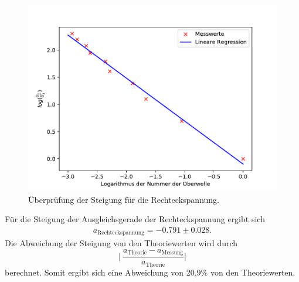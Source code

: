 \begin{figure}[H]
  \centering
  \includegraphics{plot1.pdf}
  \caption{Überprüfung der Steigung für die Rechteckspannung.}
  \label{fig:plot1}
\end{figure}
Für die Steigung der Ausgleichsgerade der Rechteckspannung ergibt sich
\begin{align*}
 a_{\text{Rechteckspannung}}= -0.791 \pm 0.028.
\end{align*}
Die Abweichung der Steigung von den Theoriewerten wird durch
\begin{equation}
  \Biggl\lvert \: \frac{a_{\text{Theorie}}-a_{\text{Messung}}}{a_{\text{Theorie}}} \Biggr\rvert
  \label{eqn:abw}
\end{equation}
berechnet.
Somit ergibt sich eine Abweichung von 20,9\% von den Theoriewerten.

